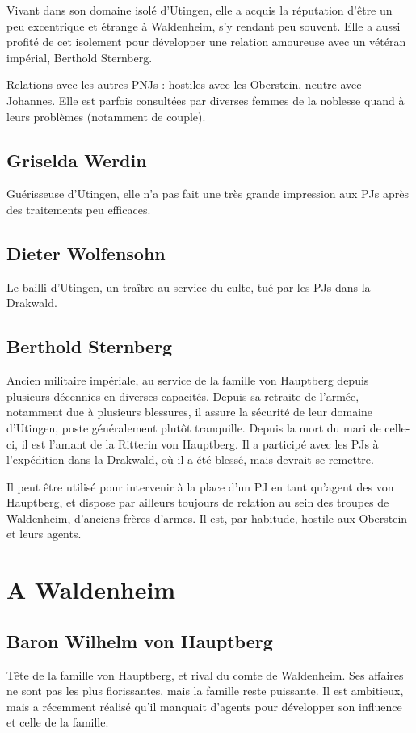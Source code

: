 \documentclass[10pt,a4paper]{book}
\begin{document}
Vivant dans son domaine isolé d'Utingen, elle a acquis la réputation d'être un peu excentrique et étrange à Waldenheim, s'y rendant peu souvent. Elle a aussi profité de cet isolement pour développer une relation amoureuse avec un vétéran impérial, Berthold Sternberg. 

Relations avec les autres PNJs : hostiles avec les Oberstein, neutre avec Johannes. Elle est parfois consultées par diverses femmes de la noblesse quand à leurs problèmes (notamment de couple).
\subsection{Griselda Werdin}
Guérisseuse d'Utingen, elle n'a pas fait une très grande impression aux PJs après des traitements peu efficaces.
\subsection{Dieter Wolfensohn}
Le bailli d'Utingen, un traître au service du culte, tué par les PJs dans la Drakwald.
\subsection{Berthold Sternberg}
Ancien militaire impériale, au service de la famille von Hauptberg depuis plusieurs décennies en diverses capacités. Depuis sa retraite de l'armée, notamment due à plusieurs blessures, il assure la sécurité de leur domaine d'Utingen, poste généralement plutôt tranquille. Depuis la mort du mari de celle-ci, il est l'amant de la Ritterin von Hauptberg.
Il a participé avec les PJs à l'expédition dans la Drakwald, où il a été blessé, mais devrait se remettre.

Il peut être utilisé pour intervenir à la place d'un PJ en tant qu'agent des von Hauptberg, et dispose par ailleurs toujours de relation au sein des troupes de Waldenheim, d'anciens frères d'armes. Il est, par habitude, hostile aux Oberstein et leurs agents.
\section{A Waldenheim}
\subsection{Baron Wilhelm von Hauptberg}
Tête de la famille von Hauptberg, et rival du comte de Waldenheim. Ses affaires ne sont pas les plus florissantes, mais la famille reste puissante. Il est ambitieux, mais a récemment réalisé qu'il manquait d'agents pour développer son influence et celle de la famille.
\end{document}
